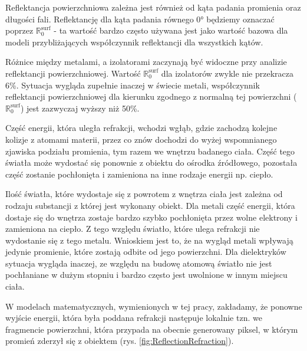 \documentclass[../main.tex]{subfiles}
\begin{document}
Reflektancja powierzchniowa zależna jest również od kąta padania promienia oraz długości fali. Reflektancję dla kąta padania równego $\ang{0}$ będziemy oznaczać poprzez $\mathbb{R}^{\text{surf}}_{0}$ - ta wartość bardzo często używana jest jako wartość bazowa dla modeli przybliżających współczynnik reflektancji dla wszystkich kątów. 

Różnice między metalami, a izolatorami zaczynają być widoczne przy analizie reflektancji powierzchniowej. Wartość $\mathbb{R}^{\text{surf}}_{0}$ dla izolatorów zwykle nie przekracza 6\%. Sytuacja wygląda zupełnie inaczej w świecie metali, współczynnik reflektancji powierzchniowej dla kierunku zgodnego z normalną tej powierzchni ($\mathbb{R}^{\text{surf}}_{0}$) jest zazwyczaj wyższy niż 50\%.

Część energii, która uległa refrakcji, wchodzi wgłąb, gdzie zachodzą kolejne kolizje z atomami materii, przez co znów dochodzi do wyżej wspomnianego zjawiska podziału promienia, tym razem we wnętrzu badanego ciała. Część tego światła może wydostać się ponownie z obiektu do ośrodka źródłowego, pozostała część zostanie pochłonięta i zamieniona na inne rodzaje energii np. ciepło.

Ilość światła, które wydostaje się z powrotem z wnętrza ciała jest zależna od rodzaju substancji z której jest wykonany obiekt. Dla metali część energii, która dostaje się do wnętrza zostaje bardzo szybko pochłonięta przez wolne elektrony i zamieniona na ciepło. Z tego względu światło, które ulega refrakcji nie wydostanie się z tego metalu. Wnioskiem jest to, że na wygląd metali wpływają jedynie promienie, które zostają odbite od jego powierzchni. Dla dielektryków sytuacja wygląda inaczej, ze względu na budowę atomową światło nie jest pochłaniane w dużym stopniu i bardzo często jest uwolnione w innym miejscu ciała.

W modelach matematycznych, wymienionych w tej pracy, zakładamy, że ponowne wyjście energii, która była poddana refrakcji następuje lokalnie tzn. we fragmencie powierzchni, która przypada na obecnie generowany piksel, w którym promień zderzył się z obiektem (rys. \ref{fig:ReflectionRefraction}).
\end{document}
